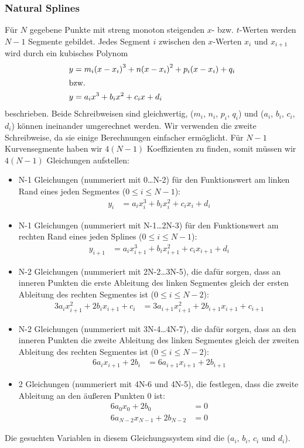 \documentclass[ngerman,origlongtable]{scrartcl}
\begin{document}
\subsubsection{Natural Splines}
Für \(N\) gegebene Punkte mit streng monoton steigenden \(x\)- bzw. \(t\)-Werten
werden \(N-1\) Segmente gebildet. Jedes Segment \(i\) zwischen den
\(x\)-Werten \(x_i\) und \(x_{i+1}\)
wird durch ein kubisches
Polynom
\begin{align*}
y&=m_i{(x-x_i)}^3+n{(x-x_i)}^2+p_i(x-x_i)+q_i\\
\intertext{bzw.}
y&=a_ix^3+b_ix^2+c_ix+d_i
\end{align*}
beschrieben. Beide Schreibweisen sind gleichwertig,
(\(m_i\), \(n_i\), \(p_i\), \(q_i\)) und (\(a_i\), \(b_i\), \(c_i\), \(d_i\))
können ineinander umgerechnet werden. Wir verwenden die zweite Schreibweise,
da sie einige Berechnungen einfacher ermöglicht.
\clearpage
Für \(N-1\) Kurvensegmente haben wir \(4(N-1)\) Koeffizienten zu finden,
somit müssen wir \(4(N-1)\) Gleichungen aufstellen:
\begin{itemize}
\item	N-1 Gleichungen (nummeriert mit 0\ldots{}N-2) für den Funktionswert
am linken Rand eines jeden Segmentes (\(0\leq i\leq N-1\)):
\begin{align*}y_i&=a_ix_i^3+b_ix_i^2+c_ix_i+d_i\end{align*}
\item	N-1 Gleichungen (nummeriert mit N-1\ldots{}2N-3) für den Funktionswert
am rechten Rand eines jeden Splines (\(0\leq i\leq N-1\)):
\begin{align*}y_{i+1}&=a_ix_{i+1}^3+b_ix_{i+1}^2+c_ix_{i+1}+d_i\end{align*}
\item	N-2 Gleichungen (nummeriert mit 2N-2\ldots{}3N-5), die dafür sorgen,
dass an inneren Punkten die erste Ableitung des linken Segmentes gleich
der ersten Ableitung des rechten Segmentes ist (\(0\leq i\leq N-2\)):
\begin{align*}3a_ix_{i+1}^2+2b_ix_{i+1}+c_i&=3a_{i+1}x_{i+1}^2+2b_{i+1}x_{i+1}+c_{i+1}\end{align*}
\item	N-2 Gleichungen (nummeriert mit 3N-4\ldots{}4N-7), die dafür sorgen,
dass an den inneren Punkten die zweite Ableitung des linken Segmentes
gleich der zweiten Ableitung des rechten Segmentes ist
(\(0\leq i\leq N-2\)):
\begin{align*}6a_ix_{i+1}+2b_i&=6a_{i+1}x_{i+1}+2b_{i+1}\end{align*}
\item	2 Gleichungen (nummeriert mit 4N-6 und 4N-5), die festlegen,
dass die zweite Ableitung an den äußeren Punkten 0 ist:
\begin{align*}
6a_0x_0+2b_0&=0\\[0.2em]
6a_{N-2}x_{N-1}+2b_{N-2}&=0\end{align*}
\end{itemize}
Die gesuchten Variablen in diesem Gleichungssystem sind
die (\(a_i\), \(b_i\), \(c_i\) und \(d_i\)).
\end{document}
